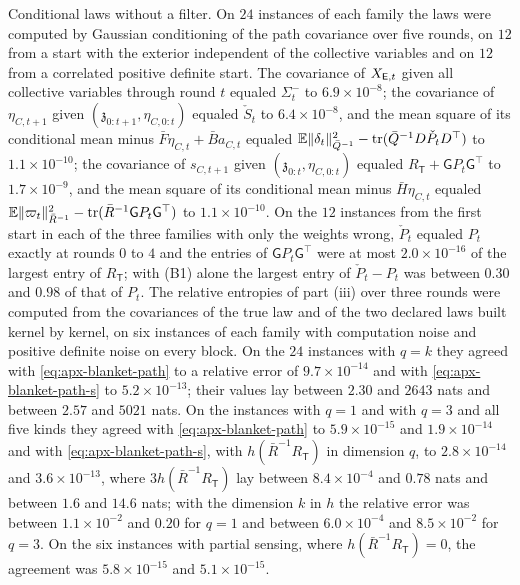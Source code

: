 \begin{numcheck}
Conditional laws without a filter. On $24$ instances of each family the laws were computed by Gaussian conditioning of the path covariance over five rounds, on $12$ from a start with the exterior independent of the collective variables and on $12$ from a correlated positive definite start. The covariance of $X_{\mathsf{E},t}$ given all collective variables through round $t$ equaled $\Sigma^-_t$ to $6.9\times10^{-8}$; the covariance of $\eta_{C,t+1}$ given $(\mathfrak z_{0:t+1},\eta_{C,0:t})$ equaled $\check S_t$ to $6.4\times10^{-8}$, and the mean square of its conditional mean minus $\bar F\eta_{C,t}+\bar Ba_{C,t}$ equaled $\mathbb{E}\Vert\delta_t\Vert^2_{\bar Q^{-1}}-\operatorname{tr}(\bar Q^{-1}D\check P_tD^\top)$ to $1.1\times10^{-10}$; the covariance of $s_{C,t+1}$ given $(\mathfrak z_{0:t},\eta_{C,0:t})$ equaled $R_{\mathsf T}+\mathsf GP_t\mathsf G^\top$ to $1.7\times10^{-9}$, and the mean square of its conditional mean minus $\bar H\eta_{C,t}$ equaled $\mathbb{E}\Vert\varpi_t\Vert^2_{\bar R^{-1}}-\operatorname{tr}(\bar R^{-1}\mathsf GP_t\mathsf G^\top)$ to $1.1\times10^{-10}$. On the $12$ instances from the first start in each of the three families with only the weights wrong, $\check P_t$ equaled $P_t$ exactly at rounds $0$ to $4$ and the entries of $\mathsf GP_t\mathsf G^\top$ were at most $2.0\times10^{-16}$ of the largest entry of $R_{\mathsf T}$; with (B1) alone the largest entry of $\check P_t-P_t$ was between $0.30$ and $0.98$ of that of $P_t$. The relative entropies of part (iii) over three rounds were computed from the covariances of the true law and of the two declared laws built kernel by kernel, on six instances of each family with computation noise and positive definite noise on every block. On the $24$ instances with $q=k$ they agreed with \eqref{eq:apx-blanket-path} to a relative error of $9.7\times10^{-14}$ and with \eqref{eq:apx-blanket-path-s} to $5.2\times10^{-13}$; their values lay between $2.30$ and $2643$ nats and between $2.57$ and $5021$ nats. On the instances with $q=1$ and with $q=3$ and all five kinds they agreed with \eqref{eq:apx-blanket-path} to $5.9\times10^{-15}$ and $1.9\times10^{-14}$ and with \eqref{eq:apx-blanket-path-s}, with $h(\bar R^{-1}R_{\mathsf T})$ in dimension $q$, to $2.8\times10^{-14}$ and $3.6\times10^{-13}$, where $3h(\bar R^{-1}R_{\mathsf T})$ lay between $8.4\times10^{-4}$ and $0.78$ nats and between $1.6$ and $14.6$ nats; with the dimension $k$ in $h$ the relative error was between $1.1\times10^{-2}$ and $0.20$ for $q=1$ and between $6.0\times10^{-4}$ and $8.5\times10^{-2}$ for $q=3$. On the six instances with partial sensing, where $h(\bar R^{-1}R_{\mathsf T})=0$, the agreement was $5.8\times10^{-15}$ and $5.1\times10^{-15}$.


\end{numcheck}
